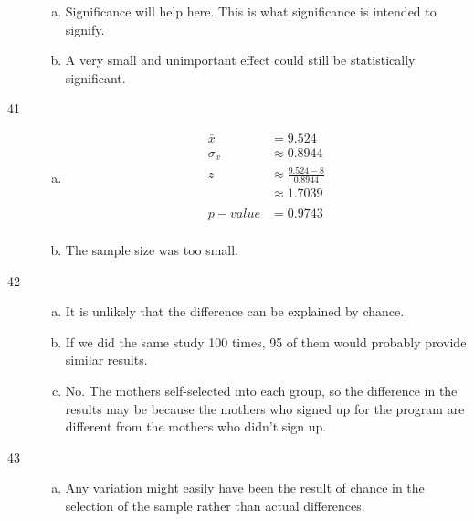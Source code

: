 \documentclass[letterpaper, landscape]{exam}
\begin{document}
\begin{description}
\begin{enumerate}[(a)]
          \item Significance will help here. This is what significance is
            intended to signify.

          \item A very small and unimportant effect could still be statistically
            significant.

        \end{enumerate}

      \item[41] 
        \begin{enumerate}[(a)]
          \item 
            \begin{align*}
              \bar{x}          & = 9.524 \\
              \sigma_{\bar{x}} & \approx 0.8944 \\
              z                & \approx \frac{9.524 - 8}{0.8944} \\
                               & \approx 1.7039 \\
              \\
              p-value          & = 0.9743 \\
            \end{align*}

          \item The sample size was too small.
        \end{enumerate}

      \item[42] 
        \begin{enumerate}[(a)]
          \item It is unlikely that the difference can be explained by chance.

          \item If we did the same study 100 times, 95 of them would probably
            provide similar results.

          \item No. The mothers self-selected into each group, so the difference
            in the results may be because the mothers who signed up for the
            program are different from the mothers who didn't sign up.
        \end{enumerate}
        
      \item[43]
        \begin{enumerate}[(a)]
          \item Any variation might easily have been the result of chance in the
            selection of the sample rather than actual differences.


\end{enumerate}
\end{description}
\end{document}
